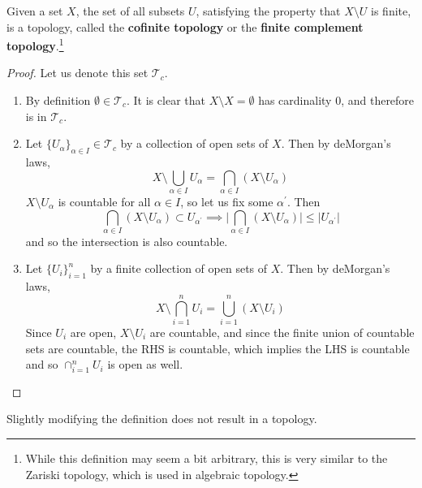\documentclass{article}
\begin{document}
    \begin{theorem}
      Given a set $X$, the set of all subsets $U$, satisfying the property that $X \setminus U$ is finite, is a topology, called the \textbf{cofinite topology} or the \textbf{finite complement topology}.\footnote{While this definition may seem a bit arbitrary, this is very similar to the Zariski topology, which is used in algebraic topology.} 
    \end{theorem}
    \begin{proof}
      Let us denote this set $\mathscr{T}_c$. 
      \begin{enumerate}
        \item By definition $\emptyset \in \mathscr{T}_c$. It is clear that $X \setminus X = \emptyset$ has cardinality $0$, and therefore is in $\mathscr{T}_c$. 

        \item Let $\{U_\alpha\}_{\alpha \in I} \in \mathcal{T}_c$ by a collection of open sets of $X$. Then by deMorgan's laws, 
        \begin{equation}
          X \setminus \bigcup_{\alpha \in I} U_{\alpha} = \bigcap_{\alpha \in I} (X \setminus U_\alpha)
        \end{equation}
        $X \setminus U_\alpha$ is countable for all $\alpha \in I$, so let us fix some $\alpha^\prime$. Then 
        \begin{equation}
          \bigcap_{\alpha \in I} (X \setminus U_\alpha) \subset U_{\alpha^\prime} \implies \bigg| \bigcap_{\alpha \in I} (X \setminus U_\alpha) \bigg| \leq \big| U_{\alpha^\prime} \big| 
        \end{equation}
        and so the intersection is also countable. 

        \item Let $\{U_i\}_{i=1}^n$ by a finite collection of open sets of $X$. Then by deMorgan's laws, 
        \begin{equation}
          X \setminus \bigcap_{i=1}^n U_i = \bigcup_{i=1}^n (X \setminus U_i)
        \end{equation}
        Since $U_i$ are open, $X \setminus U_i$ are countable, and since the finite union of countable sets are countable, the RHS is countable, which implies the LHS is countable and so $\cap_{i=1}^n U_i$ is open as well. 
      \end{enumerate}
    \end{proof} 

    Slightly modifying the definition does not result in a topology. 
\end{document}

